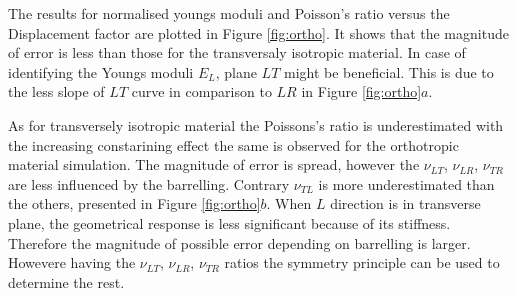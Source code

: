 \documentclass[review]{elsarticle}
\begin{document}
The results for normalised youngs moduli and Poisson's ratio versus the
Displacement factor are plotted in Figure \ref{fig:ortho}. It shows that the
magnitude of error is less than those for the transversaly isotropic material. 
In case of identifying the Youngs moduli $E_L$, plane  $LT$ might be
beneficial. This is due to the less slope of $LT$ curve in comparison to $LR$ in
Figure \ref{fig:ortho}$a$. \par
As for transversely isotropic material the Poissons's ratio is underestimated
with the increasing constarining effect the same is observed for the orthotropic
material simulation. The magnitude of error is spread, however the $\nu_{LT}$,
$\nu_{LR}$, $\nu_{TR}$ are less influenced by the barrelling. Contrary
$\nu_{TL}$ is more underestimated than the others, presented in Figure
\ref{fig:ortho}$b$. When $L$
direction is in transverse plane, the geometrical response is less significant
because of its stiffness. Therefore the magnitude of possible error depending on
barrelling is larger. Howevere having the $\nu_{LT}$,
$\nu_{LR}$, $\nu_{TR}$ ratios the symmetry principle can
be used to determine the rest.
\end{document}
